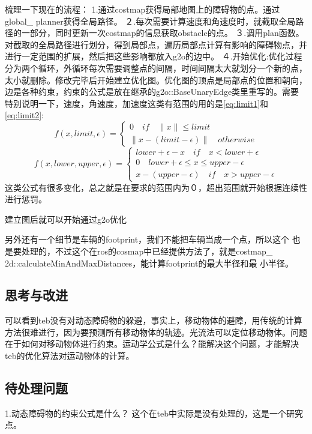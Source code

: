 \documentclass[10pt,a4paper]{article}
\theoremstyle{mythm}
\numberwithin{equation}{section}
\begin{document}
梳理一下现在的流程：
1.通过costmap获得局部地图上的障碍物的点。通过global\_ planner获得全局路径。
２.每次需要计算速度和角速度时，就截取全局路径的一部分，同时更新一次costmap的信息获取obstacle的点。
３.调用plan函数。对截取的全局路径进行划分，得到局部点，遍历局部点计算有影响的障碍物点，并进行一定范围的扩展，然后把这些影响都放入g2o的边中。
４.开始优化:优化过程分为两个循环，外循环每次需要调整点的间隔，时间间隔太大就划分一个新的点，太小就删除。修改完毕后开始建立优化图。优化图的顶点是局部点的位置和朝向，边是各种约束，约束的公式是放在继承的g2o::BaseUnaryEdge类里重写的。需要特别说明一下，速度，角速度，加速度这类有范围的用的是\ref{eq:limit1}和\ref{eq:limit2}:
\begin{equation}
f(x,limit,\epsilon) = 
\left\{
             \begin{array}{lr}
             0 \quad if \quad \|x\|\leq limit\\
             \|x-(limit-\epsilon)\| \quad otherwise  
             \end{array}
\right.
\label{eq:limit1}
\end{equation}
\begin{equation}
f(x,lower,upper,\epsilon) = 
\left\{
             \begin{array}{lr}
             lower+\epsilon-x \quad if \quad x < lower+\epsilon\\
             0 \quad lower+\epsilon \leq x\leq upper-\epsilon\\
             x-(upper-\epsilon) \quad if \quad x > upper-\epsilon  
             \end{array}
\right.
\label{eq:limit2}
\end{equation}
这类公式有很多变化，总之就是在要求的范围内为０，超出范围就开始根据连续性进行惩罚。

建立图后就可以开始通过g2o优化

另外还有一个细节是车辆的footprint，我们不能把车辆当成一个点，所以这个
也是要处理的，不过这个在ros的cosmap中已经提供方法了，就是costmap\_ 
2d::calculateMinAndMaxDistances，能计算footprint的最大半径和最
小半径。
\subsection{思考与改进}
可以看到teb没有对动态障碍物的躲避，事实上，移动物体的避障，用传统的计算方法很难进行，因为要预测所有移动物体的轨迹。光流法可以定位移动物体。问题在于如何对移动物体进行约束。运动学公式是什么？能解决这个问题，才能解决teb的优化算法对运动物体的计算。
\subsection{待处理问题}
1.动态障碍物的约束公式是什么？
这个在teb中实际是没有处理的，这是一个研究点。
\end{document}

